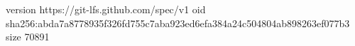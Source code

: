 version https://git-lfs.github.com/spec/v1
oid sha256:abda7a8778935f326fd755c7aba923ed6efa384a24c504804ab898263ef077b3
size 70891

